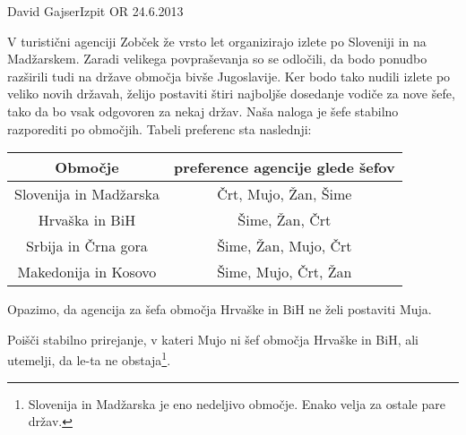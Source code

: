\begin{naloga}{David Gajser}{Izpit OR 24.6.2013}
\begin{vprasanje}
V turistični agenciji Zobček že vrsto let
organizirajo izlete po Sloveniji in na Madžarskem.
Zaradi velikega povpraševanja so se odločili,
da bodo ponudbo razširili tudi na države območja bivše Jugoslavije.
Ker bodo tako nudili izlete po veliko novih državah,
želijo postaviti štiri najboljše dosedanje vodiče za nove šefe,
tako da bo vsak odgovoren za nekaj držav.
Naša naloga je šefe stabilno razporediti po območjih.
Tabeli preferenc sta naslednji:
\begin{center}

\bigskip
\begin{tabular}{c|c}
Območje                & preference agencije glede šefov \\ \hline
Slovenija in Madžarska & Črt, Mujo, Žan, Šime \\
Hrvaška in BiH         & Šime, Žan, Črt \\
Srbija in Črna gora    & Šime, Žan, Mujo, Črt \\
Makedonija in Kosovo   & Šime, Mujo, Črt, Žan
\end{tabular}
\end{center}
Opazimo, da agencija za šefa območja Hrvaške in BiH ne želi postaviti Muja.

Poišči stabilno prirejanje, v kateri Mujo ni šef območja Hrvaške in BiH,
ali utemelji, da le-ta ne obstaja\footnote{
Slovenija in Madžarska je eno nedeljivo območje.
Enako velja za ostale pare držav.
}.
\end{vprasanje}
\begin{odgovor}
\end{odgovor}
\end{naloga}
